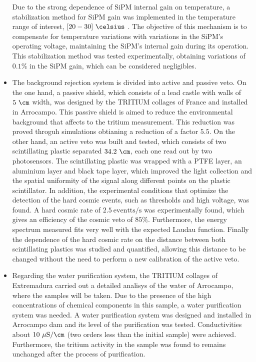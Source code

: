 \begin{itemize}

Due to the strong dependence of SiPM internal gain on temperature, a stabilization method for SiPM gain was implemented in the temperature range of interest, $[20-30]~\celsius$ . The objective of this mechanism is to compensate for temperature variations with variations in the SiPM's operating voltage, maintaining the SiPM's internal gain during its operation. This stabilization method was tested experimentally, obtaining variations of $0.1\%$ in the SiPM gain, which can be considered negligibles.

\item{} The background rejection system is divided into active and passive veto. On the one hand, a passive shield, which consists of a lead castle with walls of $5~\cm$ width, was designed by the TRITIUM collages of France and installed in Arrocampo. This passive shield is aimed to reduce the environmental background that affects to the tritium measurement. This reduction was proved throguh simulations obtianing a reduction of a factor $5.5$. On the other hand, an active veto was built and tested, which consists of two scintillating plastic separated $34.2~\cm$, each one read out by two photosensors. The scintillating plastic was wrapped with a PTFE layer, an aluminium layer and black tape layer, which improved the light collection and the spatial uniformity of the signal along different points on the plastic scintillator. In addition, the experimental conditions that optimize the detection of the hard cosmic events, such as thresholds and high voltage, was found. A hard cosmic rate of $2.5~\text{eventts}/\text{s}$ was experimentally found, which gives an efficiency of the cosmic veto of $85\%$. Furthermore, the energy spectrum measured fits very well with the expected Laudau function. Finally the dependence of the hard cosmic rate on the distance between both scintillating plastics was studied and quantified, allowing this distance to be changed without the need to perform a new calibration of the active veto.

\item{} Regarding the water purification system, the TRITIUM collages of Extremadura carried out a detailed analisys of the water of Arrocampo, where the samples will be taken. Due to the presence of the high concentrations of chemical components in this sample, a water purification system was needed. A water purification system was designed and installed in Arrocampo dam and its level of the purification was tested. Conductivities about $10~\mu\text{S}/\cm$ (two orders less than the initial sample) were achieved. Furthermore, the tritium activity in the sample was found to remains unchanged after the process of purification.

\end{itemize}

